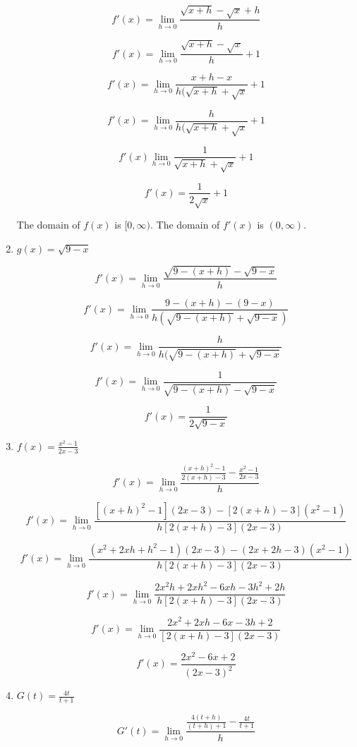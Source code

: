\documentclass{article}
\begin{document}
\begin{enumerate}
			$$f'(x) = \lim \limits _{h \to 0} \frac{\sqrt{x+h} - \sqrt{x} + h}{h}$$

			$$f'(x) = \lim \limits _{h \to 0} \frac{\sqrt{x+h} - \sqrt{x}}{h} + 1$$

			$$f'(x) = \lim \limits _{h \to 0} \frac{x + h - x}{h(\sqrt{x+h} + \sqrt{x}} + 1$$

			$$f'(x) = \lim \limits _{h \to 0} \frac{h}{h(\sqrt{x+h} + \sqrt{x}} + 1$$

			$$f'(x) \lim \limits _{h \to 0} \frac{1}{\sqrt{x+h} + \sqrt{x}} + 1$$

			$$f'(x) = \frac{1}{2\sqrt{x}} + 1$$

			The domain of $f(x)$ is $[0, \infty)$. The domain of $f'(x)$ is $(0, \infty)$.

		\item $g(x) = \sqrt{9-x}$

			$$f'(x) = \lim \limits _{h \to 0} \frac{\sqrt{9-(x+h)} - \sqrt{9-x}}{h}$$

			$$f'(x) = \lim \limits _{h \to 0} \frac{9-(x+h)-(9-x)}{h(\sqrt{9-(x+h)}+\sqrt{9-x})}$$

			$$f'(x) = \lim \limits _{h \to 0} \frac{h}{h(\sqrt{9-(x+h)}+\sqrt{9-x}}$$

			$$f'(x) = \lim \limits _{h \to 0} \frac{1}{\sqrt{9-(x+h)}-\sqrt{9-x}}$$

			$$f'(x) = \frac{1}{2\sqrt{9-x}}$$

		\item $f(x) = \frac{x^2 - 1}{2x - 3}$

			$$f'(x) = \lim \limits _{h \to 0} \frac{\frac{(x+h)^2-1}{2(x+h)-3} - \frac{x^2-1}{2x-3}}{h}$$

			$$f'(x) = \lim \limits _{h \to 0} \frac{[(x+h)^2-1](2x-3) - [2(x+h)-3](x^2-1)}{h[2(x+h)-3](2x-3)}$$

			$$f'(x) = \lim \limits _{h \to 0} \frac{(x^2+2xh+h^2-1)(2x-3)-(2x+2h-3)(x^2-1)}{h[2(x+h)-3](2x-3)}$$

			$$f'(x) = \lim \limits _{h \to 0} \frac{2x^2h+2xh^2-6xh-3h^2+2h}{h[2(x+h)-3](2x-3)}$$

			$$f'(x) = \lim \limits _{h \to 0} \frac{2x^2+2xh-6x-3h+2}{[2(x+h)-3](2x-3)}$$

			$$f'(x) = \frac{2x^2-6x+2}{(2x-3)^2}$$

		\item $G(t) = \frac{4t}{t+1}$

			$$G'(t) = \lim \limits _{h \to 0} \frac{\frac{4(t+h)}{(t+h)+1} - \frac{4t}{t+1}}{h}$$


\end{enumerate}
\end{document}
